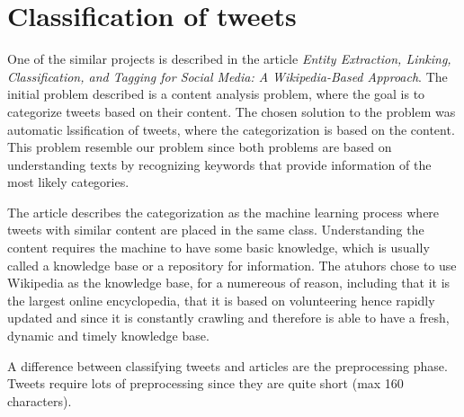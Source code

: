 \section{Classification of tweets}
One of the similar projects is described in the article \emph{Entity Extraction, Linking, Classification, and Tagging for Social Media: A Wikipedia-Based Approach}\cite{entityextraction}. The initial problem described is a content analysis problem, where the goal is to categorize tweets based on their content. The chosen solution to the problem was automatic lssification of tweets, where the categorization is based on the content. This problem resemble our problem since both problems are based on understanding texts by recognizing keywords that provide information of the most likely categories. 



The article describes the categorization as the machine learning process where tweets with similar content are placed in the same class. Understanding the content requires the machine to have some basic knowledge, which is usually called a knowledge base or a repository for information. The atuhors chose to use Wikipedia as the knowledge base, for a numereous of reason, including that it is the largest online encyclopedia, that it is based on volunteering hence rapidly updated and since it is constantly crawling and therefore is able to have a fresh, dynamic and timely knowledge base. 



A difference between classifying tweets and articles are the preprocessing phase. Tweets require lots of preprocessing since they are quite short (max 160 characters). 


